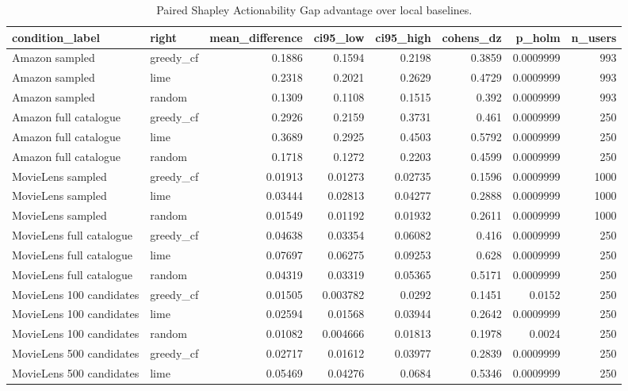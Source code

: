 \begin{table}[t]\centering
\caption{Paired Shapley Actionability Gap advantage over local baselines.}\label{tab:gap-advantage}
\begin{tabular}{llrrrrrr}
\toprule
condition\_label & right & mean\_difference & ci95\_low & ci95\_high & cohens\_dz & p\_holm & n\_users \\
\midrule
Amazon sampled & greedy\_cf & 0.1886 & 0.1594 & 0.2198 & 0.3859 & 0.0009999 & 993 \\
Amazon sampled & lime & 0.2318 & 0.2021 & 0.2629 & 0.4729 & 0.0009999 & 993 \\
Amazon sampled & random & 0.1309 & 0.1108 & 0.1515 & 0.392 & 0.0009999 & 993 \\
Amazon full catalogue & greedy\_cf & 0.2926 & 0.2159 & 0.3731 & 0.461 & 0.0009999 & 250 \\
Amazon full catalogue & lime & 0.3689 & 0.2925 & 0.4503 & 0.5792 & 0.0009999 & 250 \\
Amazon full catalogue & random & 0.1718 & 0.1272 & 0.2203 & 0.4599 & 0.0009999 & 250 \\
MovieLens sampled & greedy\_cf & 0.01913 & 0.01273 & 0.02735 & 0.1596 & 0.0009999 & 1000 \\
MovieLens sampled & lime & 0.03444 & 0.02813 & 0.04277 & 0.2888 & 0.0009999 & 1000 \\
MovieLens sampled & random & 0.01549 & 0.01192 & 0.01932 & 0.2611 & 0.0009999 & 1000 \\
MovieLens full catalogue & greedy\_cf & 0.04638 & 0.03354 & 0.06082 & 0.416 & 0.0009999 & 250 \\
MovieLens full catalogue & lime & 0.07697 & 0.06275 & 0.09253 & 0.628 & 0.0009999 & 250 \\
MovieLens full catalogue & random & 0.04319 & 0.03319 & 0.05365 & 0.5171 & 0.0009999 & 250 \\
MovieLens 100 candidates & greedy\_cf & 0.01505 & 0.003782 & 0.0292 & 0.1451 & 0.0152 & 250 \\
MovieLens 100 candidates & lime & 0.02594 & 0.01568 & 0.03944 & 0.2642 & 0.0009999 & 250 \\
MovieLens 100 candidates & random & 0.01082 & 0.004666 & 0.01813 & 0.1978 & 0.0024 & 250 \\
MovieLens 500 candidates & greedy\_cf & 0.02717 & 0.01612 & 0.03977 & 0.2839 & 0.0009999 & 250 \\
MovieLens 500 candidates & lime & 0.05469 & 0.04276 & 0.0684 & 0.5346 & 0.0009999 & 250 \\

\end{tabular}
\end{table}
